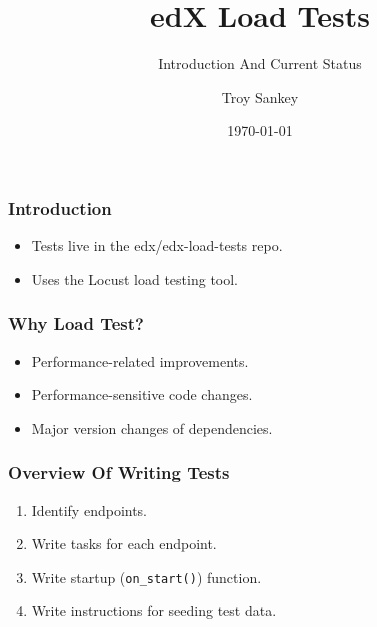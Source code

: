 \documentclass{beamer}
\title{edX Load Tests}
\subtitle{Introduction And Current Status}
\author{Troy Sankey}
\date{\today}
\begin{document}
\begin{frame}
\titlepage
\end{frame}

\begin{frame}
\frametitle{Introduction}
\begin{itemize}
\item Tests live in the edx/edx-load-tests repo.\pause
\item Uses the Locust load testing tool.
\end{itemize}
\end{frame}


\begin{frame}
\frametitle{Why Load Test?}
\begin{itemize}
\item Performance-related improvements.\pause
\item Performance-sensitive code changes.
\item Major version changes of dependencies.
\end{itemize}
\end{frame}


\begin{frame}
\frametitle{Overview Of Writing Tests}
\begin{enumerate}
\item Identify endpoints.\pause
\item Write tasks for each endpoint.\pause
\item Write startup (\texttt{on\_start()}) function.\pause
\item Write instructions for seeding test data.
\end{enumerate}
\end{frame}


\newcommand{\highlight}[1]{%
  \begingroup
  \setlength{\fboxsep}{0pt}%
  \colorbox{yellow}{\strut#1}%
  \endgroup
}
\end{document}
